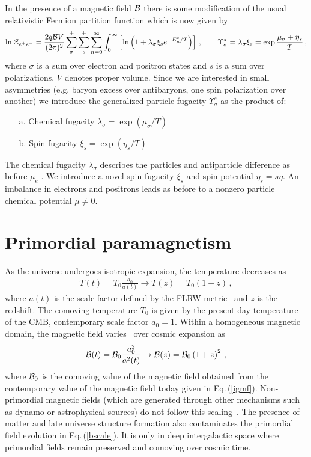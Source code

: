 \documentclass[a4paper]{article}
\newcommand{\req}[1]{Eq.\,(\ref{#1})}
\begin{document}
In the presence of a magnetic field ${\cal B}$ there is some modification of the usual relativistic Fermion partition function which is now given  by
\begin{align}
    \label{partition}
    \ln{\cal Z}_{e^{+}e^{-}}=\frac{2q{\cal B}V}{(2\pi)^{2}}\sum_{\sigma}^{\pm}\sum_{s}^{\pm}\sum_{n=0}^{\infty}\int_{0}^{\infty}\left[\ln\left(1+\lambda_{\sigma}\xi_{s}e^{-E_{n}^{s}/T}\right)\right]\,,\qquad\Upsilon_{\sigma}^{s}=\lambda_{\sigma}\xi_{s}=\exp{\frac{\mu_{\sigma}+\eta_{s}}{T}}\,,
\end{align}
where $\sigma$ is a sum over electron and positron states and $s$ is a sum over polarizations. $V$ denotes  proper volume. Since we are interested in small asymmetries (e.g. baryon excess over antibaryons, one spin polarization over another) we introduce the generalized particle fugacity $\Upsilon_{\sigma}^{s}$ as the product of:
\begin{itemize}
    \item[a.] Chemical fugacity $\lambda_{\sigma}=\exp{(\mu_{\sigma}/T)}$
    \item[b.] Spin fugacity $\xi_{s}=\exp{(\eta_{s}/T)}$
\end{itemize}
The chemical fugacity $\lambda_{\sigma}$ describes  the particles and antiparticle difference as before $\mu_e$ . We introduce a novel spin fugacity $\xi_{s}$ and spin potential $\eta_{s}=s\eta$. An imbalance in electrons and positrons leads as before to a nonzero particle chemical potential $\mu\neq0$. 

\section{Primordial paramagnetism }
\label{sec:fugacity}
\noindent
As the universe undergoes isotropic expansion, the temperature decreases as 
\begin{align}
    \label{tscale}
    T(t)=T_{0}\frac{a_{0}}{a(t)}\rightarrow T(z)=T_{0}(1+z)\,,
\end{align}
where $a(t)$ is the scale factor defined by the FLRW metric~\cite{weinberg1972gravitation} and $z$ is the redshift. The comoving temperature $T_{0}$ is given by the present day temperature of the CMB,  contemporary scale factor $a_{0}=1$. Within a homogeneous magnetic domain, the magnetic field varies~\cite{durrer2013cosmological} over cosmic expansion as
\begin{align}
    \label{bscale}
    {\cal B}(t)={\cal B}_{0}\frac{a_{0}^{2}}{a^{2}(t)}\rightarrow{\cal B}(z)={\cal B}_{0}\left(1+z\right)^{2}\,,
\end{align}
where ${\cal B}_{0}$ is the comoving value of the magnetic field obtained from the contemporary value of the magnetic field today  given in \req{igmf}. Non-primordial magnetic fields (which are generated through other mechanisms  such as dynamo or astrophysical sources) do not follow this scaling~\cite{pomakov2022redshift}. The presence of matter and late universe structure formation also  contaminates the primordial field evolution in \req{bscale}. It is only in deep intergalactic space where primordial fields remain preserved and comoving over cosmic time.
\end{document}
